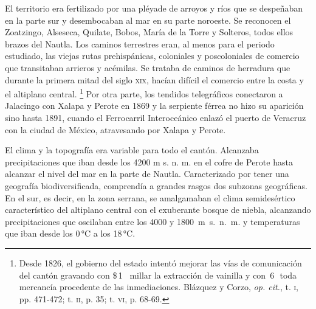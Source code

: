 \documentclass[14pt,twoside,final]{extbook} %
\let\oldfootnote\footnote
\renewcommand\footnote[1]{%
\oldfootnote{\hspace{1mm}#1}}
\begin{document}
El territorio era fertilizado por una pléyade de arroyos y ríos que se despeñaban en la parte sur y desembocaban al mar en su parte noroeste. Se reconocen el Zoatzingo, Alseseca, Quilate, Bobos, María de la Torre y Solteros, todos ellos brazos del Nautla. Los caminos terrestres eran, al menos para el periodo estudiado, las viejas rutas prehispánicas, coloniales y poscoloniales de comercio que transitaban arrieros y acémilas. Se trataba de caminos de herradura que durante la primera mitad del siglo \textsc{xix}, hacían difícil el comercio entre la costa y el altiplano central.\footnote{Desde 1826, el gobierno del estado\index[lugares]{Veracruz!gobierno} intentó mejorar las vías de comunicación del cantón\index[lugares]{Jalacingo!cantón} gravando con \$\,1 \texttimes\ millar la extracción de vainilla y con \textcent\,6\,\textonequarter\ toda mercancía procedente de las inmediaciones. Blázquez y Corzo, \emph{op. cit.}, t. \textsc{i}, pp. 471-472; t. \textsc{ii}, p. 35; t. \textsc{vi}, p. 68-69.} Por otra parte, los tendidos telegráficos conectaron a Jalacingo con Xalapa y Perote en 1869 y la serpiente férrea no hizo su aparición sino hasta 1891, cuando el Ferrocarril Interoceánico enlazó el puerto de Veracruz con la ciudad de México, atravesando por Xalapa y Perote.

El clima y la topografía era variable para todo el cantón. Alcanzaba precipitaciones que iban desde los 4200 m s. n. m. en el cofre de Perote hasta alcanzar el nivel del mar en la parte de Nautla. Caracterizado por tener una geografía biodiversificada, comprendía a grandes rasgos dos subzonas geográficas. En el sur, es decir, en la zona serrana, se amalgamaban el clima semidesértico característico del altiplano central con el exuberante bosque de niebla, alcanzando precipitaciones que oscilaban entre los 4000 y \mbox{1800 m s. n. m.} y temperaturas que iban desde los 0\,°C a los 18\,°C.
\end{document}
